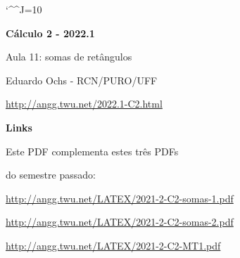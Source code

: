 \documentclass[oneside,12pt]{article}
\begin{document}
\catcode`\^^J=10
\pu
\def\pictgridstyle{\color{GrayPale}\linethickness{0.3pt}}
\def\pictaxesstyle{\linethickness{0.5pt}}



\def\u#1{\par{\footnotesize \url{#1}}}

\def\drafturl{http://angg.twu.net/LATEX/2022-1-C2.pdf}
\def\drafturl{http://angg.twu.net/2022.1-C2.html}
\def\draftfooter{\tiny \href{\drafturl}{\jobname{}} \ColorBrown{\shorttoday{} \hours}}



%

\thispagestyle{empty}

\begin{center}

\vspace*{1.2cm}

{\bf \Large Cálculo 2 - 2022.1}

\bsk

Aula 11: somas de retângulos

\bsk

Eduardo Ochs - RCN/PURO/UFF

\url{http://angg.twu.net/2022.1-C2.html}

\end{center}

\newpage


{\bf Links}

Este PDF complementa estes três PDFs

do semestre passado:

\ssk

{\footnotesize

\url{http://angg.twu.net/LATEX/2021-2-C2-somas-1.pdf}

\url{http://angg.twu.net/LATEX/2021-2-C2-somas-2.pdf}

\url{http://angg.twu.net/LATEX/2021-2-C2-MT1.pdf}

}
\end{document}
